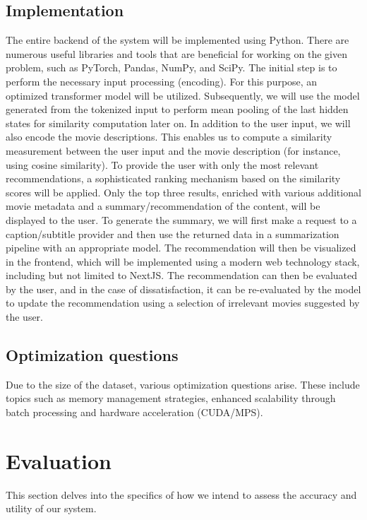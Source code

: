 \documentclass[12pt,a4paper]{article}
\begin{document}
  \subsection{Implementation}

  The entire backend of the system will be implemented using Python.
  There are numerous useful libraries and tools that are beneficial for working on the given problem, such as PyTorch, Pandas, NumPy, and SciPy.
  The initial step is to perform the necessary input processing (encoding).
  For this purpose, an optimized transformer model will be utilized.
  Subsequently, we will use the model generated from the tokenized input to perform mean pooling of the last hidden states for similarity computation later on.
  In addition to the user input, we will also encode the movie descriptions.
  This enables us to compute a similarity measurement between the user input and the movie description (for instance, using cosine similarity).
  To provide the user with only the most relevant recommendations, a sophisticated ranking mechanism based on the similarity scores will be applied.
  Only the top three results, enriched with various additional movie metadata and a summary/recommendation of the content, will be displayed to the user.
  To generate the summary, we will first make a request to a caption/subtitle provider and then use the returned data in a summarization pipeline with an appropriate model.
  The recommendation will then be visualized in the frontend, which will be implemented using a modern web technology stack, including but not limited to NextJS.
  The recommendation can then be evaluated by the user, and in the case of dissatisfaction, it can be re-evaluated by the model to update the recommendation using a selection of irrelevant movies suggested by the user.

  \subsection{Optimization questions}
  Due to the size of the dataset, various optimization questions arise.
  These include topics such as memory management strategies, enhanced scalability through batch processing and hardware acceleration (CUDA/MPS).

  \section{Evaluation}

  This section delves into the specifics of how we intend to assess the accuracy and utility of our system.
\end{document}
